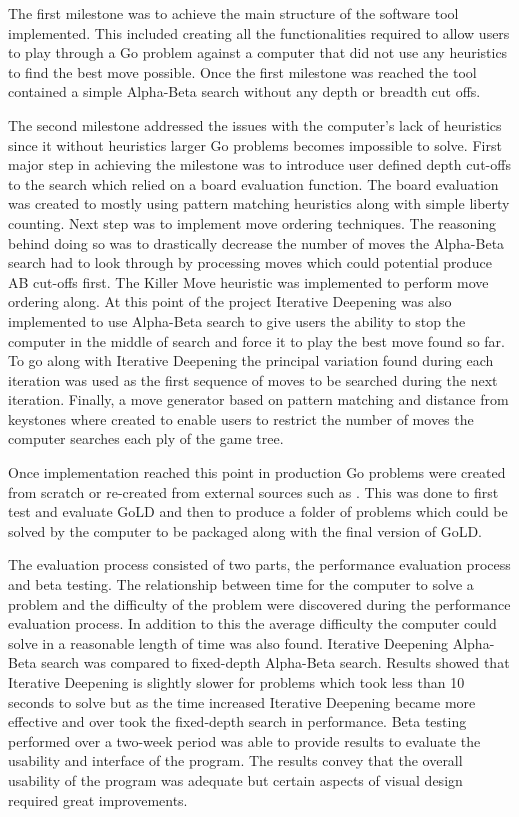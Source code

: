\documentclass{l4proj}
\begin{document}
The first milestone was to achieve the main structure of the software tool implemented. This included creating all the functionalities required to allow users to play through a Go problem against a computer that did not use any heuristics to find the best move possible. Once the first milestone was reached the tool contained a simple Alpha-Beta search without any depth or breadth cut offs.

The second milestone addressed the issues with the computer’s lack of heuristics since it without heuristics larger Go problems becomes impossible to solve. First major step in achieving the milestone was to introduce user defined depth cut-offs to the search which relied on a board evaluation function. The board evaluation was created to mostly using pattern matching heuristics along with simple liberty counting. Next step was to implement move ordering techniques. The reasoning behind doing so was  to drastically decrease the number of moves the Alpha-Beta search had to look through by processing moves which could potential produce AB cut-offs first. The Killer Move heuristic was implemented to perform move ordering along. At this point of the project Iterative Deepening was also implemented to use Alpha-Beta search to give users the ability to stop the computer in the middle of search and force it to play the best move found so far. To go along with Iterative Deepening the principal variation found during each iteration was used as the first sequence of moves to be searched during the next iteration. Finally, a move generator based on pattern matching and distance from keystones where created to enable users to restrict the number of moves the computer searches each ply of the game tree.

Once implementation reached this point in production Go problems were created from scratch or re-created from external sources such as \cite{Cho1993}\cite{Davies1975}\cite{GoProblems}. This was done to first test and evaluate GoLD and then to produce a folder of problems which could be solved by the computer to be packaged along with the final version of GoLD.

The evaluation process consisted of two parts, the performance evaluation process and beta testing. The relationship between time for the computer to solve a problem and the difficulty of the problem were discovered during the performance evaluation process. In addition to this the average difficulty the computer could solve in a reasonable length of time was also found. Iterative Deepening Alpha-Beta search was compared to fixed-depth Alpha-Beta search. Results showed that Iterative Deepening is slightly slower for problems which took less than 10 seconds to solve but as the time increased Iterative Deepening became more effective and over took the fixed-depth search in performance. Beta testing performed over a two-week period was able to provide results to evaluate the usability and interface of the program. The results convey that the overall usability of the program was adequate but certain aspects of visual design required great improvements.
\end{document}
